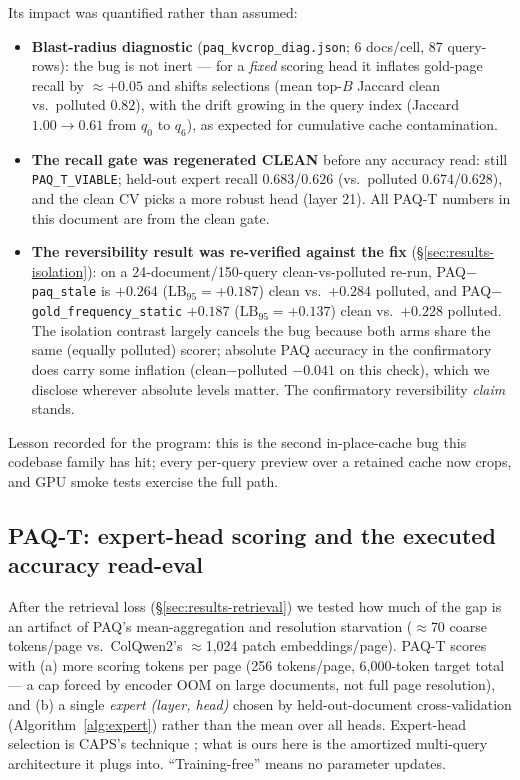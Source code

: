 \documentclass[11pt,letterpaper]{article}
\newcommand{\paq}{\textsc{PAQ}}
\newcommand{\paqt}{\textsc{PAQ-T}}
\newcommand{\lb}{\mathrm{LB}_{95}}
\begin{document}
Its impact was quantified rather than assumed:
\begin{itemize}
  \item \textbf{Blast-radius diagnostic} (\texttt{paq\_kvcrop\_diag.json}; 6 docs/cell, 87
        query-rows): the bug is not inert --- for a \emph{fixed} scoring head it inflates
        gold-page recall by $\approx$$+0.05$ and shifts selections (mean top-$B$ Jaccard clean
        vs.\ polluted $0.82$), with the drift growing in the query index (Jaccard $1.00 \to 0.61$
        from $q_0$ to $q_6$), as expected for cumulative cache contamination.
  \item \textbf{The recall gate was regenerated CLEAN} before any accuracy read: still
        \texttt{PAQ\_T\_VIABLE}; held-out expert recall $0.683$/$0.626$ (vs.\ polluted
        $0.674$/$0.628$), and the clean CV picks a more robust head (layer 21). All \paqt{}
        numbers in this document are from the clean gate.
  \item \textbf{The reversibility result was re-verified against the fix}
        (\S\ref{sec:results-isolation}): on a 24-document/150-query clean-vs-polluted re-run,
        \paq{}$-$\texttt{paq\_stale} is $+0.264$ ($\lb=+0.187$) clean vs.\ $+0.284$ polluted, and
        \paq{}$-$\texttt{gold\_frequency\_static} $+0.187$ ($\lb=+0.137$) clean vs.\ $+0.228$
        polluted. The isolation contrast largely cancels the bug because both arms share the same
        (equally polluted) scorer; absolute \paq{} accuracy in the confirmatory does carry some
        inflation (clean$-$polluted $-0.041$ on this check), which we disclose wherever absolute
        levels matter. The confirmatory reversibility \emph{claim} stands.
\end{itemize}
Lesson recorded for the program: this is the second in-place-cache bug this codebase family has
hit; every per-query preview over a retained cache now crops, and GPU smoke tests exercise the
full path.

\subsection{\paqt{}: expert-head scoring and the executed accuracy read-eval}\label{sec:method-paqt}
After the retrieval loss (\S\ref{sec:results-retrieval}) we tested how much of the gap is an
artifact of \paq's mean-aggregation and resolution starvation ($\approx$70 coarse tokens/page vs.\
ColQwen2's $\approx$1{,}024 patch embeddings/page). \paqt{} scores with (a) more scoring tokens
per page (256 tokens/page, 6{,}000-token target total --- a cap forced by encoder OOM on large
documents, not full page resolution), and (b) a single \emph{expert (layer, head)} chosen by
held-out-document cross-validation (Algorithm~\ref{alg:expert}) rather than the mean over all
heads. Expert-head selection is CAPS's technique \citep{zhu2026caps}; what is ours here is the
amortized multi-query architecture it plugs into. ``Training-free'' means no parameter updates.
\end{document}
